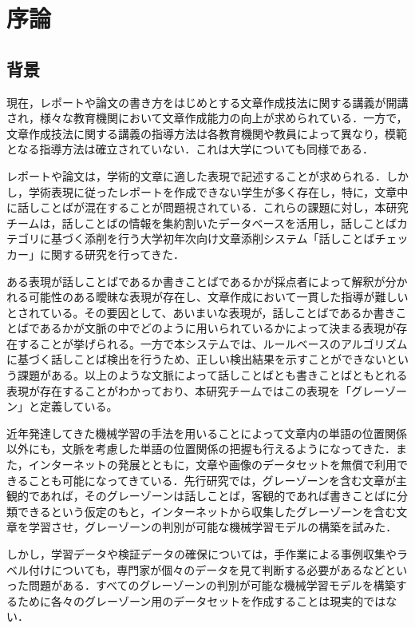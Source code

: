 \chapter{序論\label{c1}}

\section{背景}
現在，レポートや論文の書き方をはじめとする文章作成技法に関する講義が開講され，様々な教育機関において文章作成能力の向上が求められている．一方で，文章作成技法に関する講義の指導方法は各教育機関や教員によって異なり，模範となる指導方法は確立されていない．これは大学についても同様である．

レポートや論文は，学術的文章に適した表現で記述することが求められる．しかし，学術表現に従ったレポートを作成できない学生が多く存在し，特に，文章中に話しことばが混在することが問題視されている．これらの課題に対し，本研究チームは，話しことばの情報を集約割いたデータベースを活用し，話しことばカテゴリに基づく添削を行う大学初年次向け文章添削システム「話しことばチェッカー」に関する研究を行ってきた．

ある表現が話しことばであるか書きことばであるかが採点者によって解釈が分かれる可能性のある曖昧な表現が存在し、文章作成において一貫した指導が難しいとされている。その要因として、あいまいな表現が，話しことばであるか書きことばであるかが文脈の中でどのように用いられているかによって決まる表現が存在することが挙げられる。一方で本システムでは、ルールベースのアルゴリズムに基づく話しことば検出を行うため、正しい検出結果を示すことができないという課題がある。以上のような文脈によって話しことばとも書きことばともとれる表現が存在することがわかっており、本研究チームではこの表現を「グレーゾーン」と定義している。

近年発達してきた機械学習の手法を用いることによって文章内の単語の位置関係以外にも，文脈を考慮した単語の位置関係の把握も行えるようになってきた．また，インターネットの発展とともに，文章や画像のデータセットを無償で利用できることも可能になってきている．先行研究では，グレーゾーンを含む文章が主観的であれば，そのグレーゾーンは話しことば，客観的であれば書きことばに分類できるという仮定のもと，インターネットから収集したグレーゾーンを含む文章を学習させ，グレーゾーンの判別が可能な機械学習モデルの構築を試みた．

しかし，学習データや検証データの確保については，手作業による事例収集やラベル付けについても，専門家が個々のデータを見て判断する必要があるなどといった問題がある．すべてのグレーゾーンの判別が可能な機械学習モデルを構築するために各々のグレーゾーン用のデータセットを作成することは現実的ではない．

